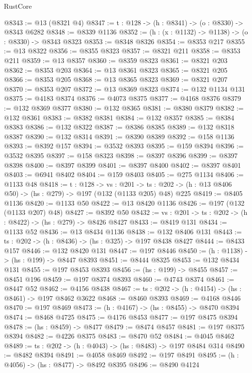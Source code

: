 \begin{lexlean}{RustCore}
\begin{coremodule}
@8343 := @13 (@8321 @4)
@8347 := {t : @128} -> (h : @8341) -> (o : @8330) -> @8343 @6282
@8348 := @8339 @1136
@8352 := (h : (x : @1132) -> @1138) -> (o : @8330) -> @8343 @8323
@8353 := @8348 @8326
@8354 := @8353 @217
@8355 := @13 @8322
@8356 := @8355 @8323
@8357 := @8321 @211
@8358 := @8353 @211
@8359 := @13 @8357
@8360 := @8359 @8323
@8361 := @8321 @203
@8362 := @8353 @203
@8364 := @13 @8361 @8323
@8365 := @8321 @205
@8366 := @8353 @205
@8368 := @13 @8365 @8323
@8369 := @8321 @207
@8370 := @8353 @207
@8372 := @13 @8369 @8323
@8374 := @132 @1134 @131
@8375 := @4183 @8374
@8376 := @4073 @8375
@8377 := @4168 @8376
@8379 := @132 @8369 @8377
@8380 := @132 @8365
@8381 := @8380 @8379
@8382 := @132 @8361
@8383 := @8382 @8381
@8384 := @132 @8357
@8385 := @8384 @8383
@8386 := @132 @8322
@8387 := @8386 @8385
@8389 := @132 @8318 @8387
@8390 := @132 @8314
@8391 := @8390 @8389
@8392 := @158 @1136
@8393 := @8392 @157
@8394 := @3532 @8393
@8395 := @159 @8394
@8396 := @3532 @8395
@8397 := @158 @8323
@8398 := @8397 @8396
@8399 := @8397 @8398
@8400 := @8397 @8399
@8401 := @8397 @8400
@8402 := @8397 @8401
@8403 := @6941 @8402
@8404 := @159 @8403
@8405 := @275 @1134
@8406 := @1133 @48
@8418 := {t : @128} ->
  {vs : @201} ->
  {ts : @202} -> (h : @13 @8406 @50) -> (hs : @279) -> @197 (@132 (@1133 @205) @48) @225
@8419 := @8405 @1136
@8420 := @1133 @50
@8422 := @13 @8420 @1136
@8426 := @197 (@132 (@1133 @207) @48)
@8427 := @8392 @50
@8432 := {vs : @201} -> {ts : @202} -> (h : @8422) -> (hs : @279) -> @8426 @8427
@8433 := @8419 @131
@8434 := @1133 @52
@8436 := @13 @8434 @1136
@8438 := @132 @8406 @131
@8443 := {ts : @202} -> (h : @8436) -> (hs : @325) -> @197 @8438 @8427
@8444 := @8433 @157
@8446 := @132 @8420 @131
@8447 := @197 @8446
@8450 := (h : @1138) -> (hs : @199) -> @8447 @8393
@8451 := @8444 @8325
@8453 := @132 @8434 @131
@8455 := @197 @8453 @8393
@8456 := (hs : @199) -> @8455
@8457 := @8451 @196
@8459 := @197 @8374 @8393
@8460 := @4743 @8374
@8461 := @8447 @52
@8462 := @4156 @8438
@8467 := {ts : @202} -> (h : @4154) -> (hs : @8461) -> @197 @8462 @3622
@8468 := @8460 @8393
@8469 := @4168 @8446
@8470 := @197 @8469
@8473 := (h : @4167) -> (hs : @8455) -> @8470 @8394
@8474 := @8468 @4725
@8475 := @4176 @8453
@8477 := @197 @8475 @8394
@8478 := (hs : @8459) -> @8477
@8479 := @8474 @8457
@8481 := @197 @8375 @8394
@8482 := @4226 @8375
@8483 := @8470 @52
@8484 := @4045 @8462
@8489 := {ts : @202} -> (h : @4043) -> (hs : @8483) -> @197 @8484 @314
@8490 := @8482 @8394
@8491 := @4058 @8469
@8492 := @197 @8491
@8495 := (h : @4056) -> (hs : @8477) -> @8492 @8395
@8496 := @8490 @4124

\end{coremodule}
\end{lexlean}
